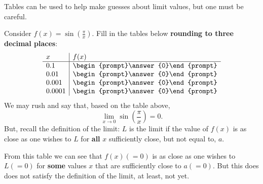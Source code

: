 \documentclass{ximera}
\begin{document}
Tables can be used to help make guesses about limit values, but one must be careful.

\begin{question}
  Consider $f(x) = \sin\left(\frac{\pi}{x}\right)$. Fill in the tables
  below \textbf{rounding to three decimal places}:
  \[
  \begin{array}{l|l}
    x      & f(x)      \\ \hline
    0.1   &  \begin{prompt}\answer{0}\end{prompt}\\
    0.01   & \begin{prompt}\answer{0}\end{prompt}\\
    0.001  &  \begin{prompt}\answer{0}\end{prompt}\\
    0.0001 &  \begin{prompt}\answer{0}\end{prompt}\\ 
  \end{array}
    \]
  We may rush and say that, based on the table above,
   \[
  \lim_{x\to 0}\sin\left(\frac{\pi}{x}\right)=0.
  \]
  But, recall the definition of the limit: $L$ is the limit if the value of $f(x)$ is as close as one wishes to $L$ for
  \textbf{all} $x$ sufficiently close, but not equal to, $a$. 
  
  From this table we can see that $f(x)(=0)$ is as close as one wishes to $L(=0)$ for \textbf{some} values $x$ that are sufficiently close to $a(=0)$.
  But this does does not satisfy the definition of the limit, at least, not yet.
  

\end{question}
\end{document}
